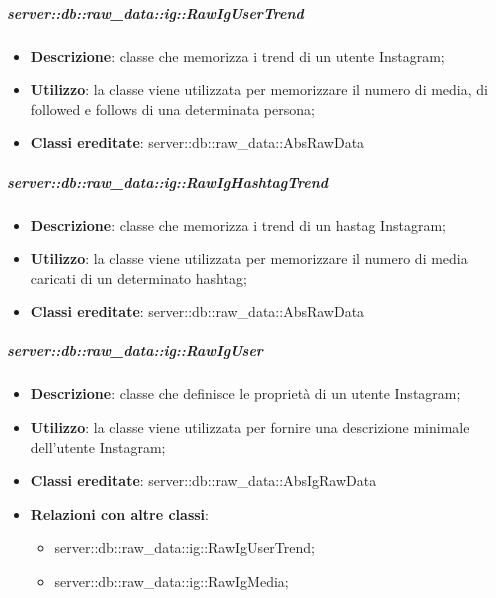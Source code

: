 		\subparagraph{server::db::raw\_data::ig::RawIgUserTrend} %
		\label{subp:server_db_raw_data_ig_rawigusertrend}
			\begin{itemize}
				\item \textbf{Descrizione}: classe che memorizza i trend di un utente Instagram;
				\item \textbf{Utilizzo}: la classe viene utilizzata per memorizzare il numero di media, di followed e follows di una determinata persona;
				\item \textbf{Classi ereditate}: server::db::raw\_data::AbsRawData
			\end{itemize}


		\subparagraph{server::db::raw\_data::ig::RawIgHashtagTrend} %
		\label{subp:server_db_raw_data_ig_rawighashtagtrend}
			\begin{itemize}
				\item \textbf{Descrizione}: classe che memorizza i trend di un hastag Instagram;
				\item \textbf{Utilizzo}: la classe viene utilizzata per memorizzare il numero di media caricati di un determinato hashtag;
				\item \textbf{Classi ereditate}: server::db::raw\_data::AbsRawData
			\end{itemize}



		\subparagraph{server::db::raw\_data::ig::RawIgUser} %
		\label{subp:server_db_raw_data_ig_rawiguser}
			\begin{itemize}
				\item \textbf{Descrizione}: classe che definisce le proprietà di un utente Instagram;
				\item \textbf{Utilizzo}: la classe viene utilizzata per fornire una descrizione minimale dell'utente Instagram;
				\item \textbf{Classi ereditate}: server::db::raw\_data::AbsIgRawData
				\item \textbf{Relazioni con altre classi}:
					\begin{itemize}
						\item server::db::raw\_data::ig::RawIgUserTrend;
						\item server::db::raw\_data::ig::RawIgMedia;
					\end{itemize}
			\end{itemize}


